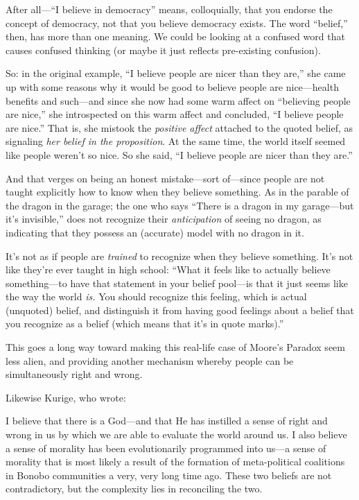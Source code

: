 {
 After all---``I believe in
democracy'' means, colloquially, that you endorse the
concept of democracy, not that you believe democracy exists. The word
``belief,'' then, has more than one
meaning. We could be looking at a confused word that causes confused
thinking (or maybe it just reflects pre-existing confusion).}

{
 So: in the original example, ``I believe people
are nicer than they are,'' she came up with some
reasons why it would be good to believe people are nice---health
benefits and such---and since she now had some warm affect on
``believing people are nice,'' she
introspected on this warm affect and concluded, ``I
believe people are nice.'' That is, she mistook the
\textit{positive affect} attached to the quoted belief, as signaling
\textit{her belief in the proposition}. At the same time, the world
itself seemed like people weren't so nice. So she said,
``I believe people are nicer than they
are.''}

{
 And that verges on being an honest mistake---sort of---since
people are not taught explicitly how to know when they believe
something. As in the parable of the dragon in the garage; the one who
says ``There is a dragon in my garage---but
it's invisible,'' does not recognize
their \textit{anticipation} of seeing no dragon, as indicating that
they possess an (accurate) model with no dragon in it.}

{
 It's not as if people are \textit{trained} to
recognize when they believe something. It's not like
they're ever taught in high school:
``What it feels like to actually believe
something---to have that statement in your belief pool---is that it
just seems like the way the world \textit{is.} You should recognize
this feeling, which is actual (unquoted) belief, and distinguish it
from having good feelings about a belief that you recognize as a belief
(which means that it's in quote
marks).''}

{
 This goes a long way toward making this real-life case of
Moore's Paradox seem less alien, and providing another
mechanism whereby people can be simultaneously right and wrong.}

{
 Likewise Kurige, who wrote:}

{
 I believe that there is a God---and that He has instilled a sense
of right and wrong in us by which we are able to evaluate the world
around us. I also believe a sense of morality has been evolutionarily
programmed into us---a sense of morality that is most likely a result
of the formation of meta-political coalitions in Bonobo communities a
very, very long time ago. These two beliefs are not contradictory, but
the complexity lies in reconciling the two.}

